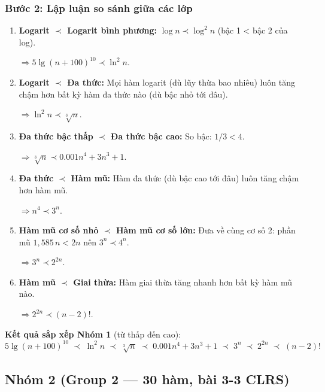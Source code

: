 \documentclass[12pt,a4paper]{article}
\begin{document}
\subsubsection{Bước 2: Lập luận so sánh giữa các lớp}

\begin{enumerate}[label=\textbf{(\alph*)}]
  \item \textbf{Logarit $\prec$ Logarit bình phương:}
    $\log n \prec \log^2 n$ (bậc 1 < bậc 2 của log).

    $\Rightarrow 5\lg(n+100)^{10} \prec \ln^2 n$.

  \item \textbf{Logarit $\prec$ Đa thức:}
    Mọi hàm logarit (dù lũy thừa bao nhiêu) luôn tăng chậm hơn bất kỳ hàm đa thức nào (dù bậc nhỏ tới đâu).

    $\Rightarrow \ln^2 n \prec \sqrt[3]{n}$.

  \item \textbf{Đa thức bậc thấp $\prec$ Đa thức bậc cao:}
    So bậc: $1/3 < 4$.

    $\Rightarrow \sqrt[3]{n} \prec 0.001n^4 + 3n^3 + 1$.

  \item \textbf{Đa thức $\prec$ Hàm mũ:}
    Hàm đa thức (dù bậc cao tới đâu) luôn tăng chậm hơn hàm mũ.

    $\Rightarrow n^4 \prec 3^n$.

  \item \textbf{Hàm mũ cơ số nhỏ $\prec$ Hàm mũ cơ số lớn:}
    Đưa về cùng cơ số 2: phần mũ $1{,}585\,n < 2n$ nên $3^n \prec 4^n$.

    $\Rightarrow 3^n \prec 2^{2n}$.

  \item \textbf{Hàm mũ $\prec$ Giai thừa:}
    Hàm giai thừa tăng nhanh hơn bất kỳ hàm mũ nào.

    $\Rightarrow 2^{2n} \prec (n-2)!$.
\end{enumerate}

\begin{resultbox}
\textbf{Kết quả sắp xếp Nhóm 1} (từ thấp đến cao):
\[
  \boxed{
    5\lg(n+100)^{10}
    \;\prec\; \ln^2 n
    \;\prec\; \sqrt[3]{n}
    \;\prec\; 0.001n^4 + 3n^3 + 1
    \;\prec\; 3^n
    \;\prec\; 2^{2n}
    \;\prec\; (n-2)!
  }
\]
\end{resultbox}

\subsection{Nhóm 2 (Group 2 --- 30 hàm, bài 3-3 CLRS)}
\end{document}
